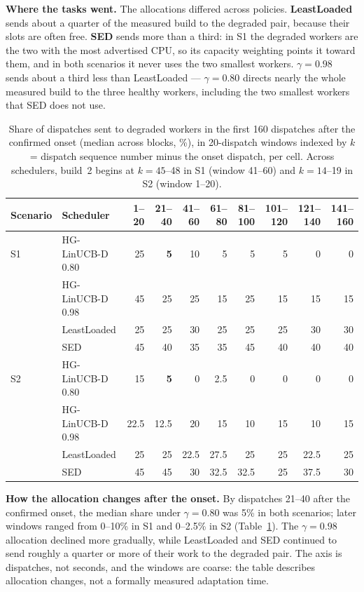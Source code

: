 \documentclass[final,5p,times,twocolumn]{elsarticle}
\begin{document}
\textbf{Where the tasks went.} The allocations differed across policies. \textbf{LeastLoaded} sends about a quarter of the measured build to the degraded pair, because their slots are often free. \textbf{SED} sends more than a third: in S1 the degraded workers are the two with the most advertised CPU, so its capacity weighting points it toward them, and in both scenarios it never uses the two smallest workers. \textbf{$\gamma=0.98$} sends about a third less than LeastLoaded --- \textbf{$\gamma=0.80$} directs nearly the whole measured build to the three healthy workers, including the two smallest workers that SED does not use.

\begin{table}[t]
\centering
\caption{Share of dispatches sent to degraded workers in the first 160 dispatches after the confirmed onset (median across blocks, \%), in 20-dispatch windows indexed by $k$ = dispatch sequence number minus the onset dispatch, per cell. Across schedulers, build~2 begins at $k=45$--48 in S1 (window 41--60) and $k=14$--19 in S2 (window 1--20).}
\label{tab:timeline}
\footnotesize
\begin{tabular}{llrrrrrrrr}
\toprule
Scenario & Scheduler & 1--20 & 21--40 & 41--60 & 61--80 & 81--100 & 101--120 & 121--140 & 141--160 \\
\midrule
S1 & HG-LinUCB-D 0.80 & 25 & \textbf{5} & 10 & 5 & 5 & 5 & 0 & 0 \\
 & HG-LinUCB-D 0.98 & 45 & 25 & 25 & 15 & 25 & 15 & 15 & 15 \\
 & LeastLoaded & 25 & 25 & 30 & 25 & 25 & 25 & 30 & 30 \\
 & SED & 45 & 40 & 35 & 35 & 45 & 40 & 40 & 40 \\
\midrule
S2 & HG-LinUCB-D 0.80 & 15 & \textbf{5} & 0 & 2.5 & 0 & 0 & 0 & 0 \\
 & HG-LinUCB-D 0.98 & 22.5 & 12.5 & 20 & 15 & 10 & 15 & 10 & 15 \\
 & LeastLoaded & 25 & 25 & 22.5 & 27.5 & 25 & 25 & 22.5 & 25 \\
 & SED & 45 & 45 & 30 & 32.5 & 32.5 & 25 & 37.5 & 30 \\
\bottomrule
\end{tabular}
\end{table}

\textbf{How the allocation changes after the onset.} By dispatches 21--40 after the confirmed onset, the median share under $\gamma=0.80$ was 5\% in both scenarios; later windows ranged from 0--10\% in S1 and 0--2.5\% in S2 (Table~\ref{tab:timeline}). The $\gamma=0.98$ allocation declined more gradually, while LeastLoaded and SED continued to send roughly a quarter or more of their work to the degraded pair. The axis is dispatches, not seconds, and the windows are coarse: the table describes allocation changes, not a formally measured adaptation time.
\end{document}
